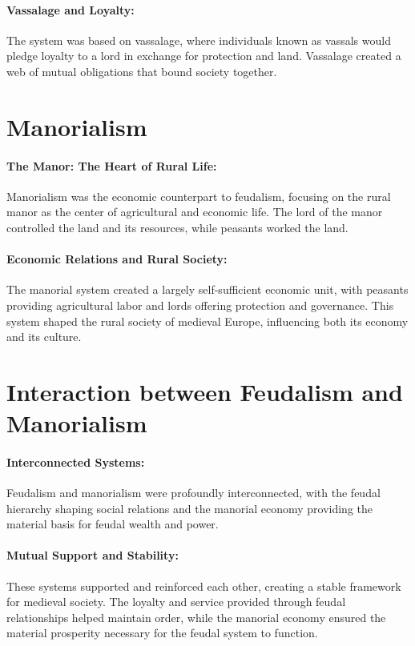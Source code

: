 \documentclass{book}
\begin{document}
\paragraph{Vassalage and Loyalty:}
The system was based on vassalage, where individuals known as vassals would pledge loyalty to a lord in exchange for protection and land. Vassalage created a web of mutual obligations that bound society together.

\section*{Manorialism}

\paragraph{The Manor: The Heart of Rural Life:}
Manorialism was the economic counterpart to feudalism, focusing on the rural manor as the center of agricultural and economic life. The lord of the manor controlled the land and its resources, while peasants worked the land.

\paragraph{Economic Relations and Rural Society:}
The manorial system created a largely self-sufficient economic unit, with peasants providing agricultural labor and lords offering protection and governance. This system shaped the rural society of medieval Europe, influencing both its economy and its culture.

\section*{Interaction between Feudalism and Manorialism}

\paragraph{Interconnected Systems:}
Feudalism and manorialism were profoundly interconnected, with the feudal hierarchy shaping social relations and the manorial economy providing the material basis for feudal wealth and power.

\paragraph{Mutual Support and Stability:}
These systems supported and reinforced each other, creating a stable framework for medieval society. The loyalty and service provided through feudal relationships helped maintain order, while the manorial economy ensured the material prosperity necessary for the feudal system to function.
\end{document}
